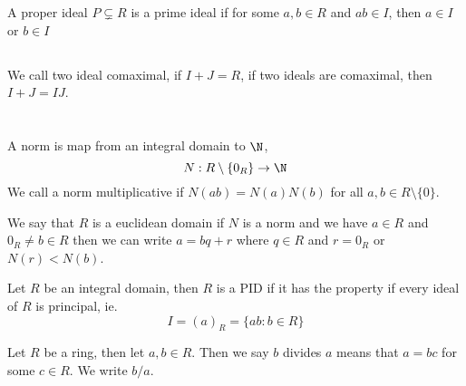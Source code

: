 \documentclass{article}
\begin{document}
\begin{ndefi}
  A proper ideal $P \subsetneq R$ is a prime ideal if for some $a, b \in R$ and $ab \in I$, then $a \in I$ or $b \in I$
\end{ndefi}

\subsection[Field of Fractions]{}

\subsection[Chinese Remainder Theorem]{}

\begin{ndefi}[Comaximal]
  We call two ideal comaximal, if $I + J = R$, if two ideals are comaximal, then $I + J = IJ$.
\end{ndefi}

\section[Divisibility and Factorisation]{}

\begin{ndefi}[Norm]
  A norm is map from an integral domain to $\N$,
  $$ N : R\setminus \{0_R\} \to \N $$
  We call a norm multiplicative if $N(ab) = N(a)N(b)$ for all $a, b \in R\setminus \{0\}$.
\end{ndefi}

\begin{ndefi}
  We say that $R$ is a euclidean domain if $N$ is a norm and we have $a \in R$ and $0_R \ne b \in R$ then we can write $a = bq + r$ where $q \in R$ and $r = 0_R$ or $N(r) < N(b)$.
\end{ndefi}

\begin{ndefi}
  Let $R$ be an integral domain, then $R$ is a PID if it has the property if every ideal of $R$ is principal, ie.
  $$ I = (a)_R = \{ab : b \in R\} $$
\end{ndefi}

\begin{ndefi}[Divisble]
  Let $R$ be a ring, then let $a, b \in R$. Then we say $b$ divides $a$ means that $a = bc$ for some $c \in R$. We write $b/a$.
\end{ndefi}
\end{document}
